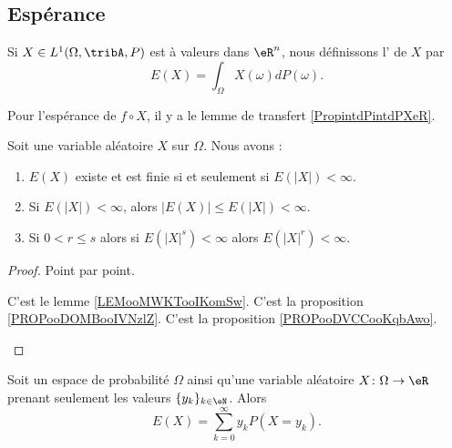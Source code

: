 \subsection{Espérance}

\begin{definition}      \label{DEFooQKFBooCBZtRG}
	Si \( X\in L^1(\Omega,\tribA,P)\) est à valeurs dans \( \eR^n\), nous définissons l' de \( X\) par
	\begin{equation}        \label{EqdCBLst}
		E(X)=\int_{\Omega}X(\omega)dP(\omega).
	\end{equation}
\end{definition}

Pour l'espérance de \( f\circ X\), il y a le lemme de transfert \ref{PropintdPintdPXeR}.

\begin{proposition}		\label{PROPooESPWooAfLmeW}
	Soit une variable aléatoire \( X\) sur \( \Omega\). Nous avons :
	\begin{enumerate}
		\item		\label{ITEMooWSJVooAlZSBZ}
		      \( E(X)\) existe et est finie si et seulement si \( E(| X |)<\infty\).
		\item		\label{ITEMooLDFWooXjyZyz}
		      Si \( E(| X |)<\infty\), alors \( | E(X) |\leq E(| X |)<\infty\).
		\item		\label{ITEMooFJCTooEBeFaz}
		      Si \( 0<r\leq s\) alors si \( E(| X |^s)<\infty\) alors \( E(| X |^r)<\infty\).
	\end{enumerate}
\end{proposition}

\begin{proof}
	Point par point.
	\begin{subproof}
		C'est le lemme \ref{LEMooMWKTooIKomSw}.
		C'est la proposition \ref{PROPooDOMBooIVNzlZ}.
		C'est la proposition \ref{PROPooDVCCooKqbAwo}.
	\end{subproof}
\end{proof}


\begin{lemma}        \label{LEMooEHTYooWmMAgf}
	Soit un espace de probabilité \( \Omega\) ainsi qu'une variable aléatoire \( X\colon \Omega\to \eR\) prenant seulement les valeurs \( \{ y_k \}_{k\in \eN}\). Alors
	\begin{equation}
		E(X)=\sum_{k=0}^{\infty}y_kP(X=y_k).
	\end{equation}
\end{lemma}

